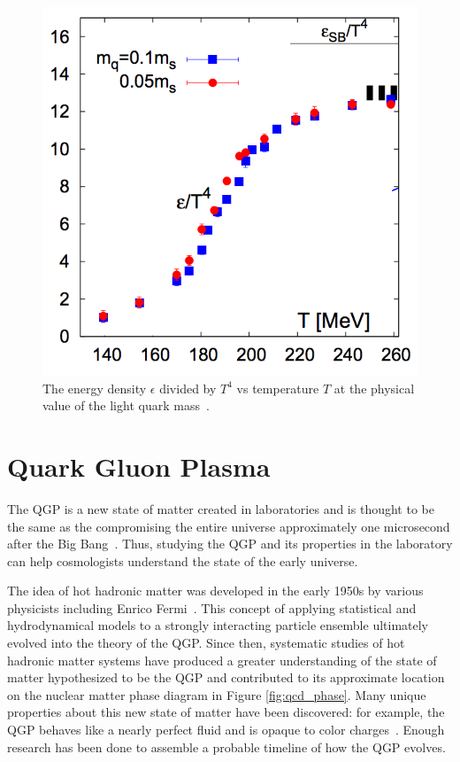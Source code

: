\begin{figure}[!ht]
\centering
\includegraphics[width=0.55\linewidth]{figs/lattice_degrees_calculation.png}
\caption{The energy density $\epsilon$ divided by $T^4$ vs temperature $T$ at the physical value of the light quark mass~\cite{PhysRevD.81.054504}.}
\label{fig:lattice_degrees_calc}
\end{figure}

\section{Quark Gluon Plasma}
The QGP is a new state of matter created in laboratories and is thought to be the same as the compromising the entire universe approximately one microsecond after the Big Bang~\cite{RAFELSKI2013155}. Thus, studying the QGP and its properties in the laboratory can help cosmologists understand the state of the early universe.

The idea of hot hadronic matter was developed in the early 1950s by various physicists including Enrico Fermi~\cite{Fermi01071950}. This concept of applying statistical and hydrodynamical models to a strongly interacting particle ensemble ultimately evolved into the theory of the QGP. Since then, systematic studies of hot hadronic matter systems have produced a greater understanding of the state of matter hypothesized to be the QGP and contributed to its approximate location on the nuclear matter phase diagram in Figure \ref{fig:qcd_phase}. Many unique properties about this new state of matter have been discovered: for example, the QGP behaves like a nearly perfect fluid and is opaque to color charges~\cite{Akiba:2015jwa}. Enough research has been done to assemble a probable timeline of how the QGP evolves.

